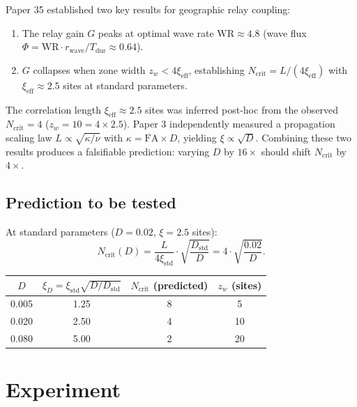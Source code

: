 \documentclass[11pt]{article}
\begin{document}
Paper 35 established two key results for geographic relay coupling:
\begin{enumerate}
  \item The relay gain $G$ peaks at optimal wave rate $\mathrm{WR} \approx 4.8$
    (wave flux $\Phi = \mathrm{WR} \cdot r_{\mathrm{wave}} / T_{\mathrm{dur}} \approx 0.64$).
  \item $G$ collapses when zone width $z_w < 4\xi_{\mathrm{eff}}$, establishing
    $N_{\mathrm{crit}} = L / (4\xi_{\mathrm{eff}})$ with $\xi_{\mathrm{eff}} \approx 2.5$
    sites at standard parameters.
\end{enumerate}
The correlation length $\xi_{\mathrm{eff}} \approx 2.5$ sites was inferred post-hoc from
the observed $N_{\mathrm{crit}} = 4$ ($z_w = 10 = 4 \times 2.5$). Paper 3 independently
measured a propagation scaling law $L \propto \sqrt{\kappa/\nu}$ with
$\kappa = \mathrm{FA} \times D$, yielding $\xi \propto \sqrt{D}$. Combining these two
results produces a falsifiable prediction: varying $D$ by $16\times$ should shift
$N_{\mathrm{crit}}$ by $4\times$.

\subsection*{Prediction to be tested}

At standard parameters ($D = 0.02$, $\xi = 2.5$ sites):
\begin{equation}
  N_{\mathrm{crit}}(D) = \frac{L}{4\xi_{\mathrm{std}}} \cdot \sqrt{\frac{D_{\mathrm{std}}}{D}}
  = 4 \cdot \sqrt{\frac{0.02}{D}}.
  \label{eq:prediction}
\end{equation}
\begin{center}
\begin{tabular}{cccc}
\toprule
$D$ & $\xi_D = \xi_\mathrm{std}\sqrt{D/D_\mathrm{std}}$ & $N_{\mathrm{crit}}$ (predicted) & $z_w$ (sites) \\
\midrule
0.005 & 1.25 & 8 & 5 \\
0.020 & 2.50 & 4 & 10 \\
0.080 & 5.00 & 2 & 20 \\
\bottomrule
\end{tabular}
\end{center}

\section{Experiment}
\end{document}
